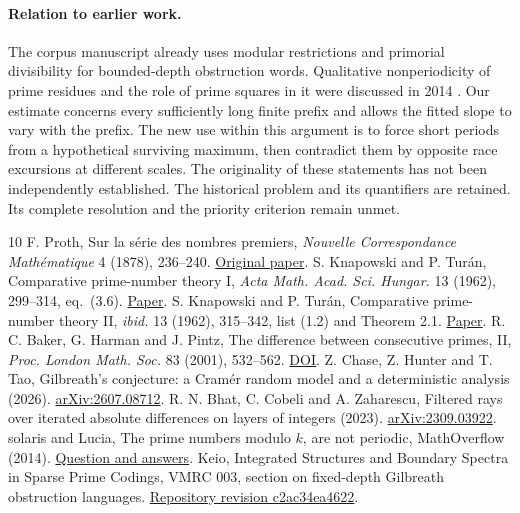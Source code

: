 \documentclass[11pt,a4paper]{article}
\begin{document}
\paragraph{Relation to earlier work.}
The corpus manuscript \cite{vm} already uses modular restrictions and primorial divisibility for bounded-depth obstruction words. Qualitative nonperiodicity of prime residues and the role of prime squares in it were discussed in 2014 \cite{mo}. Our estimate concerns every sufficiently long finite prefix and allows the fitted slope to vary with the prefix. The new use within this argument is to force short periods from a hypothetical surviving maximum, then contradict them by opposite race excursions at different scales. The originality of these statements has not been independently established. The historical problem and its quantifiers are retained. Its complete resolution and the priority criterion remain unmet.

\begin{thebibliography}{10}\small
{} F. Proth, Sur la s\'erie des nombres premiers, \emph{Nouvelle Correspondance Math\'ematique} 4 (1878), 236--240. \href{https://gdz.sub.uni-goettingen.de/download/pdf/PPN598948236_0004/LOG_0088.pdf}{Original paper}.
 S. Knapowski and P. Tur\'an, Comparative prime-number theory I, \emph{Acta Math. Acad. Sci. Hungar.} 13 (1962), 299--314, eq.~(3.6). \href{https://personal.math.ubc.ca/~gerg/teaching/592-Fall2018/papers/1962.Knapowski_1.pdf}{Paper}.
 S. Knapowski and P. Tur\'an, Comparative prime-number theory II, \emph{ibid.} 13 (1962), 315--342, list (1.2) and Theorem 2.1. \href{https://personal.math.ubc.ca/~gerg/teaching/592-Fall2018/papers/1962.Knapowski_2.pdf}{Paper}.
 R. C. Baker, G. Harman and J. Pintz, The difference between consecutive primes, II, \emph{Proc. London Math. Soc.} 83 (2001), 532--562. \href{https://doi.org/10.1112/plms/83.3.532}{DOI}.
 Z. Chase, Z. Hunter and T. Tao, Gilbreath's conjecture: a Cram\'er random model and a deterministic analysis (2026). \href{https://arxiv.org/abs/2607.08712}{arXiv:2607.08712}.
 R. N. Bhat, C. Cobeli and A. Zaharescu, Filtered rays over iterated absolute differences on layers of integers (2023). \href{https://arxiv.org/abs/2309.03922}{arXiv:2309.03922}.
 solaris and Lucia, The prime numbers modulo $k$, are not periodic, MathOverflow (2014). \href{https://mathoverflow.net/questions/168378}{Question and answers}.
 Keio, Integrated Structures and Boundary Spectra in Sparse Prime Codings, VMRC 003, section on fixed-depth Gilbreath obstruction languages. \href{https://github.com/QEEDDD/Verifiable-Mathematical-Reasoning-Corpus/tree/c2ac34ea4622778187173f41bb1996deee8081b7}{Repository revision c2ac34ea4622}.
\end{thebibliography}
\end{document}
